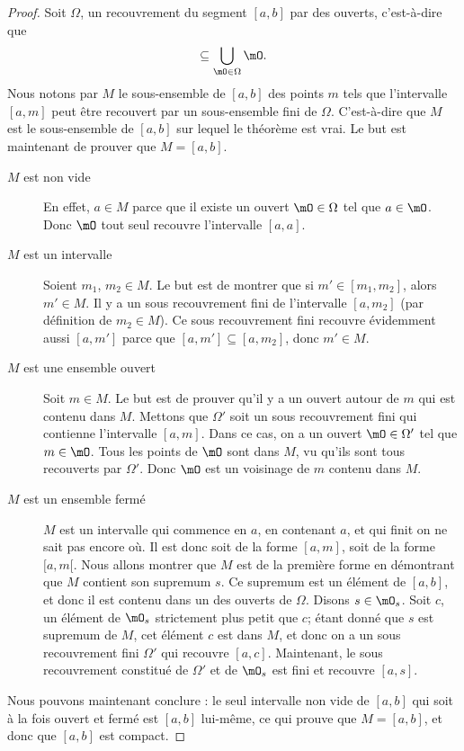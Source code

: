 \begin{proof}
    Soit $\Omega$, un recouvrement du segment $[a,b]$ par des ouverts, c'est-à-dire que
    \begin{equation}
        [a,b]\subseteq\bigcup_{\mO\in\Omega}\mO.
    \end{equation}
    Nous notons par $M$ le sous-ensemble de $[a,b]$ des points $m$ tels que l'intervalle $[a,m]$ peut être recouvert par un sous-ensemble fini de $\Omega$. C'est-à-dire que $M$ est le sous-ensemble de $[a,b]$ sur lequel le théorème est vrai. Le but est maintenant de prouver que $M=[a,b]$.
    \begin{description}
        \item[$M$ est non vide] En effet, $a\in M$ parce que il existe un ouvert $\mO\in\Omega$ tel que $a\in\mO$. Donc $\mO$ tout seul recouvre l'intervalle $[a,a]$.
        \item[$M$ est un intervalle] Soient $m_1$, $m_2\in M$. Le but est de montrer que si $m'\in[m_1,m_2]$, alors $m'\in M$. Il y a un sous recouvrement fini de l'intervalle $[a,m_2]$ (par définition de $m_2\in M$). Ce sous recouvrement fini recouvre évidemment aussi $[a,m']$ parce que $[a,m']\subseteq [a,m_2]$, donc $m'\in M$.
        \item[$M$ est une ensemble ouvert] Soit $m\in M$. Le but est de prouver qu'il y a un ouvert autour de $m$ qui est contenu dans $M$. Mettons que $\Omega'$ soit un sous recouvrement fini qui contienne l'intervalle $[a,m]$. Dans ce cas, on a un ouvert $\mO\in\Omega'$ tel que $m\in\mO$. Tous les points de $\mO$ sont dans $M$, vu qu'ils sont tous recouverts par $\Omega'$. Donc $\mO$ est un voisinage de $m$ contenu dans $M$.
        \item[$M$ est un ensemble fermé] $M$ est un intervalle qui commence en $a$, en contenant $a$, et qui finit on ne sait pas encore où. Il est donc soit de la forme $[a,m]$, soit de la forme $[a,m[$. Nous allons montrer que $M$ est de la première forme en démontrant que $M$ contient son supremum $s$. Ce supremum est un élément de $[a,b]$, et donc il est contenu dans un des ouverts de $\Omega$. Disons $s\in\mO_s$. Soit $c$, un élément de $\mO_s$ strictement plus petit que $c$; étant donné que $s$ est supremum de $M$, cet élément $c$ est dans $M$, et donc on a un sous recouvrement fini $\Omega'$ qui recouvre $[a,c]$. Maintenant, le sous recouvrement constitué de $\Omega'$ et de $\mO_s$ est fini et recouvre $[a,s]$.
    \end{description}
    Nous pouvons maintenant conclure : le seul intervalle non vide de $[a,b]$ qui soit à la fois ouvert et fermé est $[a,b]$ lui-même, ce qui prouve que $M=[a,b]$, et donc que $[a,b]$ est compact.
\end{proof}

